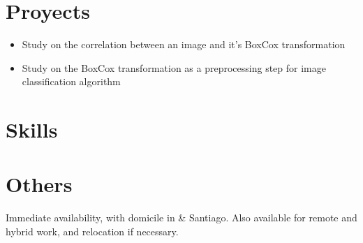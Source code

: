 \documentclass{my_cv}
\begin{document}
\section{Proyects \faCogs}

\begin{itemize}
\item Study on the correlation between an image and it's BoxCox transformation
\item Study on the BoxCox transformation as a preprocessing step for image classification algorithm
\end{itemize}

\section{Skills \faBullseye}


\section{Others \faPaperPlane}
Immediate availability, with domicile in {\valpo} \& Santiago. Also available for remote and hybrid work, and relocation if necessary.

\end{document}
